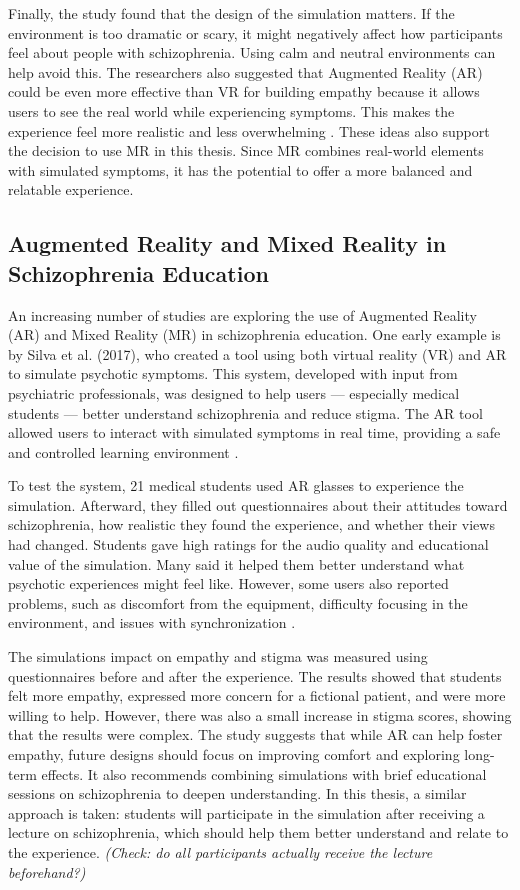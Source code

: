 Finally, the study found that the design of the simulation matters. If the environment is too dramatic or scary, it might negatively affect how participants feel about people with schizophrenia. Using calm and neutral environments can help avoid this. The researchers also suggested that Augmented Reality (AR) could be even more effective than VR for building empathy because it allows users to see the real world while experiencing symptoms. This makes the experience feel more realistic and less overwhelming \cite{Zare-Bidaki2022}. These ideas also support the decision to use MR in this thesis. Since MR combines real-world elements with simulated symptoms, it has the potential to offer a more balanced and relatable experience.


\subsection{Augmented Reality and Mixed Reality in Schizophrenia Education}

An increasing number of studies are exploring the use of Augmented Reality (AR) and Mixed Reality (MR) in schizophrenia education. One early example is by Silva et al. (2017), who created a tool using both virtual reality (VR) and AR to simulate psychotic symptoms. This system, developed with input from psychiatric professionals, was designed to help users — especially medical students — better understand schizophrenia and reduce stigma. The AR tool allowed users to interact with simulated symptoms in real time, providing a safe and controlled learning environment \cite{Silva2017}.

To test the system, 21 medical students used AR glasses to experience the simulation. Afterward, they filled out questionnaires about their attitudes toward schizophrenia, how realistic they found the experience, and whether their views had changed. Students gave high ratings for the audio quality and educational value of the simulation. Many said it helped them better understand what psychotic experiences might feel like. However, some users also reported problems, such as discomfort from the equipment, difficulty focusing in the environment, and issues with synchronization \cite{Silva2017}.

The simulations impact on empathy and stigma was measured using questionnaires before and after the experience. The results showed that students felt more empathy, expressed more concern for a fictional patient, and were more willing to help. However, there was also a small increase in stigma scores, showing that the results were complex. The study suggests that while AR can help foster empathy, future designs should focus on improving comfort and exploring long-term effects. It also recommends combining simulations with brief educational sessions on schizophrenia to deepen understanding. In this thesis, a similar approach is taken: students will participate in the simulation after receiving a lecture on schizophrenia, which should help them better understand and relate to the experience. \emph{(Check: do all participants actually receive the lecture beforehand?)}

